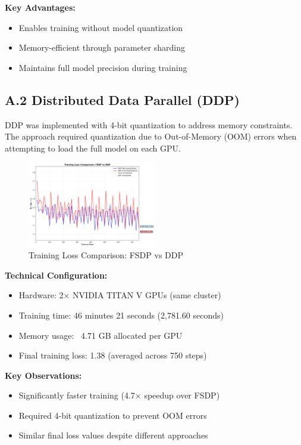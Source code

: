 \documentclass{assignment7_report}
\begin{document}
\textbf{Key Advantages:}
\begin{itemize}
    \item Enables training without model quantization
    \item Memory-efficient through parameter sharding
    \item Maintains full model precision during training
\end{itemize}

\subsection*{A.2 Distributed Data Parallel (DDP)}

DDP was implemented with 4-bit quantization to address memory constraints. The approach required quantization due to Out-of-Memory (OOM) errors when attempting to load the full model on each GPU.

\begin{figure}[h!]
    \centering
    \includegraphics[width=0.5\textwidth]{training_loss_comparison.png}
    \caption{Training Loss Comparison: FSDP vs DDP}
    \label{fig:training_loss_comparison}
\end{figure}

\textbf{Technical Configuration:}
\begin{itemize}
    \item Hardware: 2× NVIDIA TITAN V GPUs (same cluster)
    \item Training time: 46 minutes 21 seconds (2,781.60 seconds)
    \item Memory usage: ~4.71 GB allocated per GPU
    \item Final training loss: 1.38 (averaged across 750 steps)
\end{itemize}

\textbf{Key Observations:}
\begin{itemize}
    \item Significantly faster training (4.7× speedup over FSDP)
    \item Required 4-bit quantization to prevent OOM errors
    \item Similar final loss values despite different approaches
\end{itemize}
\end{document}
